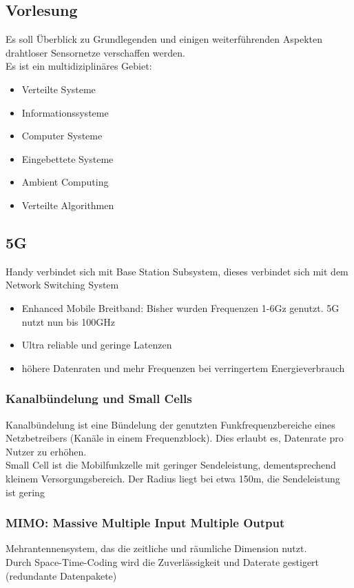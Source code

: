 \documentclass[a4paper]{article}
\begin{document}
\subsection{Vorlesung}
Es soll Überblick zu Grundlegenden und einigen weiterführenden	Aspekten drahtloser Sensornetze verschaffen werden.\\
Es ist ein multidiziplinäres Gebiet:
\begin{itemize}
	\item Verteilte Systeme
	\item Informationssysteme
	\item Computer Systeme
	\item Eingebettete Systeme
	\item Ambient Computing
	\item Verteilte Algorithmen
\end{itemize}
\subsection{5G}
Handy verbindet sich mit Base Station Subsystem, dieses verbindet sich mit dem Network Switching System
\begin{itemize}
	\item Enhanced Mobile Breitband: Bisher wurden Frequenzen 1-6Gz genutzt. 5G nutzt nun bis 100GHz
	\item Ultra reliable und geringe Latenzen
	\item höhere Datenraten und mehr Frequenzen bei verringertem Energieverbrauch
\end{itemize}
\subsubsection{Kanalbündelung und Small Cells}
Kanalbündelung ist eine Bündelung der genutzten
Funkfrequenzbereiche eines Netzbetreibers
(Kanäle in einem Frequenzblock). Dies erlaubt es,
Datenrate pro Nutzer zu erhöhen.\\
Small Cell ist die Mobilfunkzelle mit geringer Sendeleistung, dementsprechend kleinem Versorgungsbereich. Der Radius liegt bei etwa 150m, die Sendeleistung ist gering
\subsubsection{MIMO: Massive Multiple Input Multiple Output}
Mehrantennensystem, das die zeitliche und räumliche Dimension nutzt.\\
Durch Space-Time-Coding wird die Zuverlässigkeit und Daterate gestigert (redundante Datenpakete)
\end{document}
